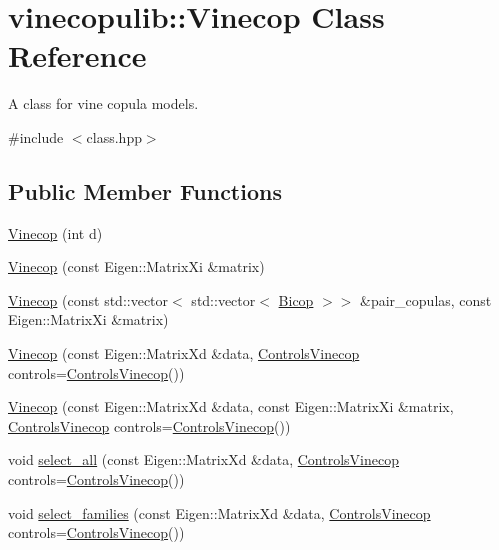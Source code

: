 \hypertarget{classvinecopulib_1_1_vinecop}{}\section{vinecopulib\+:\+:Vinecop Class Reference}
\label{classvinecopulib_1_1_vinecop}


A class for vine copula models.  




{\ttfamily \#include $<$class.\+hpp$>$}

\subsection*{Public Member Functions}
\begin{DoxyCompactItemize}
\item 
\hyperlink{classvinecopulib_1_1_vinecop_a7c6bae90feba9d70bf692e4d50d02bc7}{Vinecop} (int d)
\item 
\hyperlink{classvinecopulib_1_1_vinecop_a561fc84ab874520e6dab9107fc45579a}{Vinecop} (const Eigen\+::\+Matrix\+Xi \&matrix)
\item 
\hyperlink{classvinecopulib_1_1_vinecop_a013a9d4eef7eb5e615a18bb3c36fd5dc}{Vinecop} (const std\+::vector$<$ std\+::vector$<$ \hyperlink{classvinecopulib_1_1_bicop}{Bicop} $>$$>$ \&pair\+\_\+copulas, const Eigen\+::\+Matrix\+Xi \&matrix)
\item 
\hyperlink{classvinecopulib_1_1_vinecop_a063cd126209643379ca1c037889a754f}{Vinecop} (const Eigen\+::\+Matrix\+Xd \&data, \hyperlink{classvinecopulib_1_1_controls_vinecop}{Controls\+Vinecop} controls=\hyperlink{classvinecopulib_1_1_controls_vinecop}{Controls\+Vinecop}())
\item 
\hyperlink{classvinecopulib_1_1_vinecop_afa3742d07a18985ebb09eeba495c306b}{Vinecop} (const Eigen\+::\+Matrix\+Xd \&data, const Eigen\+::\+Matrix\+Xi \&matrix, \hyperlink{classvinecopulib_1_1_controls_vinecop}{Controls\+Vinecop} controls=\hyperlink{classvinecopulib_1_1_controls_vinecop}{Controls\+Vinecop}())
\item 
void \hyperlink{classvinecopulib_1_1_vinecop_a66c719029f9ca51eb10aeeec2d1e57ec}{select\+\_\+all} (const Eigen\+::\+Matrix\+Xd \&data, \hyperlink{classvinecopulib_1_1_controls_vinecop}{Controls\+Vinecop} controls=\hyperlink{classvinecopulib_1_1_controls_vinecop}{Controls\+Vinecop}())
\item 
void \hyperlink{classvinecopulib_1_1_vinecop_aca8e4eef8a1a4d04830c360edef60c9b}{select\+\_\+families} (const Eigen\+::\+Matrix\+Xd \&data, \hyperlink{classvinecopulib_1_1_controls_vinecop}{Controls\+Vinecop} controls=\hyperlink{classvinecopulib_1_1_controls_vinecop}{Controls\+Vinecop}())
$$
\end{DoxyCompactItemize}
